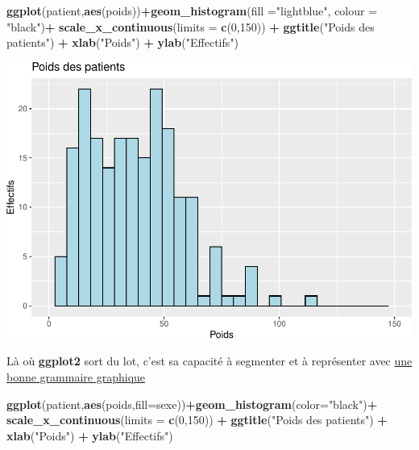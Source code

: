 \documentclass[
]{book}
\newenvironment{Shaded}{\begin{snugshade}}{\end{snugshade}}
\newcommand{\AttributeTok}[1]{\textcolor[rgb]{0.13,0.29,0.53}{#1}}
\newcommand{\DecValTok}[1]{\textcolor[rgb]{0.00,0.00,0.81}{#1}}
\newcommand{\FunctionTok}[1]{\textcolor[rgb]{0.13,0.29,0.53}{\textbf{#1}}}
\newcommand{\NormalTok}[1]{#1}
\newcommand{\SpecialCharTok}[1]{\textcolor[rgb]{0.81,0.36,0.00}{\textbf{#1}}}
\newcommand{\StringTok}[1]{\textcolor[rgb]{0.31,0.60,0.02}{#1}}
\begin{document}
\begin{Shaded}
\begin{Highlighting}[]
\FunctionTok{ggplot}\NormalTok{(patient,}\FunctionTok{aes}\NormalTok{(poids))}\SpecialCharTok{+}\FunctionTok{geom\_histogram}\NormalTok{(}\AttributeTok{fill =}\StringTok{"lightblue"}\NormalTok{, }\AttributeTok{colour =} \StringTok{"black"}\NormalTok{)}\SpecialCharTok{+}
  \FunctionTok{scale\_x\_continuous}\NormalTok{(}\AttributeTok{limits =} \FunctionTok{c}\NormalTok{(}\DecValTok{0}\NormalTok{,}\DecValTok{150}\NormalTok{)) }\SpecialCharTok{+} 
  \FunctionTok{ggtitle}\NormalTok{(}\StringTok{"Poids des patients"}\NormalTok{) }\SpecialCharTok{+} 
  \FunctionTok{xlab}\NormalTok{(}\StringTok{"Poids"}\NormalTok{) }\SpecialCharTok{+} 
  \FunctionTok{ylab}\NormalTok{(}\StringTok{"Effectifs"}\NormalTok{)}
\end{Highlighting}
\end{Shaded}

\includegraphics{_main_files/figure-latex/ggplot7-1.pdf}

Là où \textbf{ggplot2} sort du lot, c'est sa capacité à segmenter et à représenter
avec \href{https://link.springer.com/book/10.1007/0-387-28695-0}{une bonne grammaire graphique}

\begin{Shaded}
\begin{Highlighting}[]
\FunctionTok{ggplot}\NormalTok{(patient,}\FunctionTok{aes}\NormalTok{(poids,}\AttributeTok{fill=}\NormalTok{sexe))}\SpecialCharTok{+}\FunctionTok{geom\_histogram}\NormalTok{(}\AttributeTok{color=}\StringTok{"black"}\NormalTok{)}\SpecialCharTok{+}
  \FunctionTok{scale\_x\_continuous}\NormalTok{(}\AttributeTok{limits =} \FunctionTok{c}\NormalTok{(}\DecValTok{0}\NormalTok{,}\DecValTok{150}\NormalTok{)) }\SpecialCharTok{+} 
  \FunctionTok{ggtitle}\NormalTok{(}\StringTok{"Poids des patients"}\NormalTok{) }\SpecialCharTok{+} 
  \FunctionTok{xlab}\NormalTok{(}\StringTok{"Poids"}\NormalTok{) }\SpecialCharTok{+} 
  \FunctionTok{ylab}\NormalTok{(}\StringTok{"Effectifs"}\NormalTok{)}
\end{Highlighting}
\end{Shaded}
\end{document}
